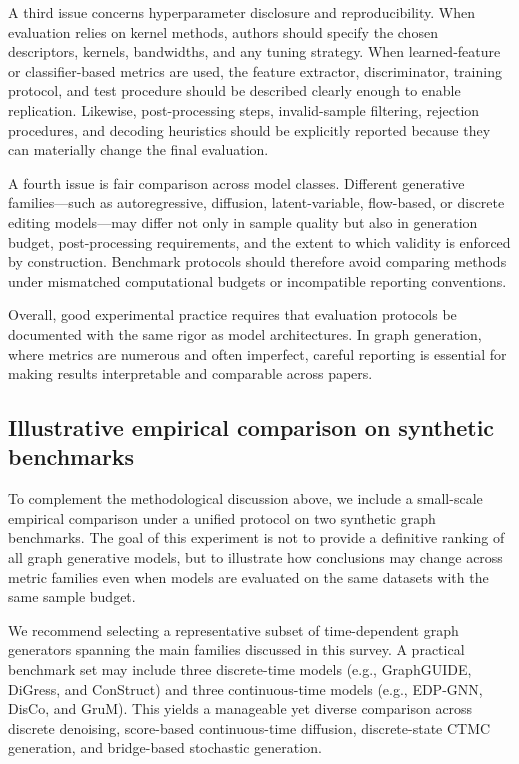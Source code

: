 \documentclass{article}
\begin{document}
A third issue concerns hyperparameter disclosure and reproducibility. When evaluation relies on kernel methods, authors should specify the chosen descriptors, kernels, bandwidths, and any tuning strategy. When learned-feature or classifier-based metrics are used, the feature extractor, discriminator, training protocol, and test procedure should be described clearly enough to enable replication. Likewise, post-processing steps, invalid-sample filtering, rejection procedures, and decoding heuristics should be explicitly reported because they can materially change the final evaluation.

A fourth issue is fair comparison across model classes. Different generative families---such as autoregressive, diffusion, latent-variable, flow-based, or discrete editing models---may differ not only in sample quality but also in generation budget, post-processing requirements, and the extent to which validity is enforced by construction. Benchmark protocols should therefore avoid comparing methods under mismatched computational budgets or incompatible reporting conventions.

Overall, good experimental practice requires that evaluation protocols be documented with the same rigor as model architectures. In graph generation, where metrics are numerous and often imperfect, careful reporting is essential for making results interpretable and comparable across papers.

\subsection{Illustrative empirical comparison on synthetic benchmarks}
\label{subsec:illustrative_benchmark}

To complement the methodological discussion above, we include a small-scale empirical comparison under a unified protocol on two synthetic graph benchmarks. The goal of this experiment is not to provide a definitive ranking of all graph generative models, but to illustrate how conclusions may change across metric families even when models are evaluated on the same datasets with the same sample budget.

We recommend selecting a representative subset of time-dependent graph generators spanning the main families discussed in this survey. A practical benchmark set may include three discrete-time models (e.g., GraphGUIDE, DiGress, and ConStruct) and three continuous-time models (e.g., EDP-GNN, DisCo, and GruM). This yields a manageable yet diverse comparison across discrete denoising, score-based continuous-time diffusion, discrete-state CTMC generation, and bridge-based stochastic generation.
\end{document}
